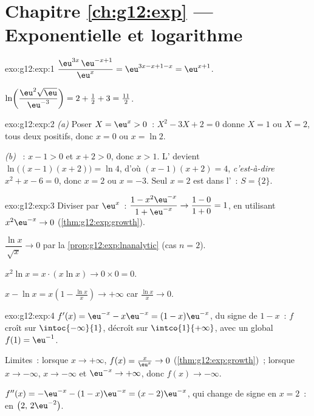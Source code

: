 \section*{Chapitre \ref{ch:g12:exp} --- Exponentielle et logarithme}

\begin{solution}{exo:g12:exp:1}
$\dfrac{\eu^{3x}\,\eu^{-x+1}}{\eu^{x}} = \eu^{3x - x + 1 - x} = \eu^{x+1}$.

$\ln\!\left(\dfrac{\eu^2\sqrt{\eu}}{\eu^{-3}}\right)
= 2 + \tfrac12 + 3 = \tfrac{11}{2}$.
\end{solution}

\begin{solution}{exo:g12:exp:2}
\emph{(a)} Poser $X = \eu^x > 0$~: $X^2 - 3X + 2 = 0$ donne $X = 1$ ou
$X = 2$, tous deux positifs, donc $x = 0$ ou $x = \ln 2$.

\emph{(b)} ~: $x - 1 > 0$ et $x + 2 > 0$, donc
$x > 1$. L' devient $\ln\bigl((x-1)(x+2)\bigr) = \ln 4$, d'où
$(x-1)(x+2) = 4$, \emph{c'est-à-dire} $x^2 + x - 6 = 0$, donc $x = 2$ ou
$x = -3$. Seul $x = 2$ est dans l'~: $S = \{2\}$.
\end{solution}

\begin{solution}{exo:g12:exp:3}
Diviser par $\eu^x$~:
$\dfrac{1 - x^2\eu^{-x}}{1 + \eu^{-x}} \to \dfrac{1-0}{1+0} = 1$, en
utilisant $x^2 \eu^{-x} \to 0$ (\cref{thm:g12:exp:growth}).

$\dfrac{\ln x}{\sqrt x} \to 0$ par la \cref{prop:g12:exp:lnanalytic} (cas
$n = 2$).

$x^2 \ln x = x \cdot (x \ln x) \to 0 \times 0 = 0$.

$x - \ln x = x\left(1 - \frac{\ln x}{x}\right) \to +\infty$ car
$\frac{\ln x}{x} \to 0$.
\end{solution}

\begin{solution}{exo:g12:exp:4}
$f'(x) = \eu^{-x} - x\eu^{-x} = (1 - x)\eu^{-x}$, du signe de $1 - x$~:
$f$ croît sur $\intoc{-\infty}{1}$, décroît sur $\intco{1}{+\infty}$,
avec un  global $f(1) = \eu^{-1}$.

Limites~: lorsque $x \to +\infty$, $f(x) = \frac{x}{\eu^x} \to 0$
(\cref{thm:g12:exp:growth})~; lorsque $x \to -\infty$, $x \to -\infty$ et
$\eu^{-x} \to +\infty$, donc $f(x) \to -\infty$.

$f''(x) = -\eu^{-x} - (1-x)\eu^{-x} = (x - 2)\eu^{-x}$, qui change de
signe en $x = 2$~:  en $\bigl(2,\, 2\eu^{-2}\bigr)$.
\end{solution}

